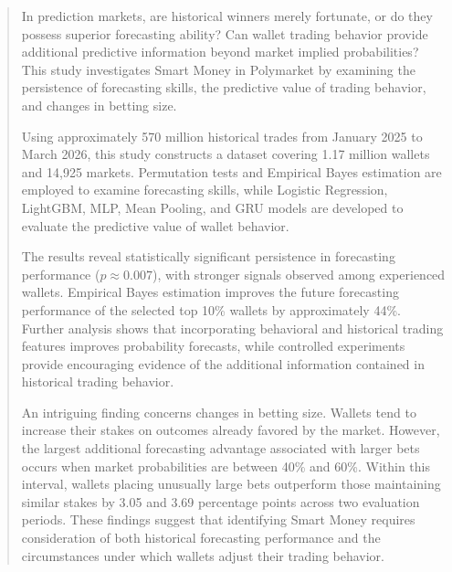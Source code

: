 \begin{abstract}
In prediction markets, are historical winners merely fortunate, or do they possess superior forecasting ability? Can wallet trading behavior provide additional predictive information beyond market implied probabilities? This study investigates Smart Money in Polymarket by examining the persistence of forecasting skills, the predictive value of trading behavior, and changes in betting size.

Using approximately 570 million historical trades from January 2025 to March 2026, this study constructs a dataset covering 1.17 million wallets and 14,925 markets. Permutation tests and Empirical Bayes estimation are employed to examine forecasting skills, while Logistic Regression, LightGBM, MLP, Mean Pooling, and GRU models are developed to evaluate the predictive value of wallet behavior.

The results reveal statistically significant persistence in forecasting performance ($p\approx 0.007$), with stronger signals observed among experienced wallets. Empirical Bayes estimation improves the future forecasting performance of the selected top 10\% wallets by approximately 44\%. Further analysis shows that incorporating behavioral and historical trading features improves probability forecasts, while controlled experiments provide encouraging evidence of the additional information contained in historical trading behavior.

An intriguing finding concerns changes in betting size. Wallets tend to increase their stakes on outcomes already favored by the market. However, the largest additional forecasting advantage associated with larger bets occurs when market probabilities are between 40\% and 60\%. Within this interval, wallets placing unusually large bets outperform those maintaining similar stakes by 3.05 and 3.69 percentage points across two evaluation periods. These findings suggest that identifying Smart Money requires consideration of both historical forecasting performance and the circumstances under which wallets adjust their trading behavior.
\end{abstract}
